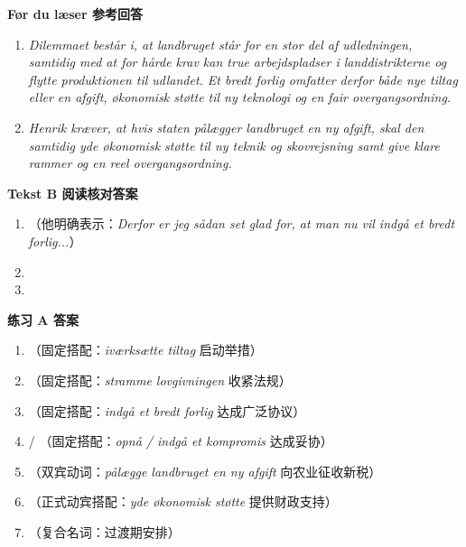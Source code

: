 \begin{answerbox}
\textbf{Før du læser 参考回答}
\begin{enumerate}
  \item \textit{Dilemmaet består i, at landbruget står for en stor del af udledningen, samtidig med at for hårde krav kan true arbejdspladser i landdistrikterne og flytte produktionen til udlandet. Et bredt forlig omfatter derfor både nye tiltag eller en afgift, økonomisk støtte til ny teknologi og en fair overgangsordning.}
  \item \textit{Henrik kræver, at hvis staten pålægger landbruget en ny afgift, skal den samtidig yde økonomisk støtte til ny teknik og skovrejsning samt give klare rammer og en reel overgangsordning.}
\end{enumerate}

\textbf{Tekst B 阅读核对答案}
\begin{enumerate}
  \item {}（他明确表示：\textit{Derfor er jeg sådan set glad for, at man nu vil indgå et bredt forlig...}）
  \item {}
  \item {}
\end{enumerate}

\textbf{练习 A 答案}
\begin{enumerate}
  \item {}（固定搭配：\textit{iværksætte tiltag} 启动举措）
  \item {}（固定搭配：\textit{stramme lovgivningen} 收紧法规）
  \item {}（固定搭配：\textit{indgå et bredt forlig} 达成广泛协议）
  \item {} / （固定搭配：\textit{opnå / indgå et kompromis} 达成妥协）
  \item {}（双宾动词：\textit{pålægge landbruget en ny afgift} 向农业征收新税）
  \item {}（正式动宾搭配：\textit{yde økonomisk støtte} 提供财政支持）
  \item {}（复合名词：过渡期安排）
\end{enumerate}


\end{answerbox}
